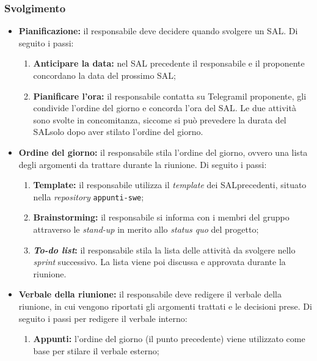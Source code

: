 \subsubsection{Svolgimento}
\begin{itemize}

	\item \textbf{Pianificazione:} il responsabile deve decidere quando svolgere
	      un SAL\g. Di seguito i passi:
	      \begin{enumerate}
		      \item \textbf{Anticipare la data:} nel SAL\g
		            precedente il responsabile e il proponente concordano
		            la data del prossimo SAL\g;

		      \item \textbf{Pianificare l'ora:} il responsabile contatta su
		            Telegram\g il proponente, gli condivide l'ordine del
		            giorno e concorda l'ora del SAL\g. Le due attività
		            sono svolte in concomitanza, siccome si può prevedere la
		            durata del SAL\g solo dopo aver stilato l'ordine del
		            giorno.
	      \end{enumerate}

	\item \textbf{Ordine del giorno:} il responsabile stila l'ordine del
	      giorno, ovvero una lista degli argomenti da trattare durante la
	      riunione. Di seguito i passi:
	      \begin{enumerate}
		      \item \textbf{Template:} il responsabile utilizza il \textit{template}
		            dei SAL\g precedenti, situato nella \textit{repository\g}
		            \texttt{appunti-swe};

		      \item \textbf{Brainstorming:} il responsabile si informa con i
		            membri del gruppo attraverso le \textit{stand-up} in merito
		            allo \textit{status quo} del progetto;

		      \item \textbf{\textit{To-do list}:} il responsabile stila la lista
		            delle attività da svolgere nello \textit{sprint} successivo. La
		            lista viene poi discussa e approvata durante la riunione.
	      \end{enumerate}

	\item \textbf{Verbale della riunione:} il responsabile deve redigere il
	      verbale della riunione, in cui vengono riportati gli argomenti
	      trattati e le decisioni prese. Di seguito i passi per redigere il
	      verbale interno:
	      \begin{enumerate}
		      \item \textbf{Appunti:} l'ordine del giorno (il punto precedente)
		            viene utilizzato come base per stilare il verbale esterno;


\end{enumerate}
\end{itemize}

